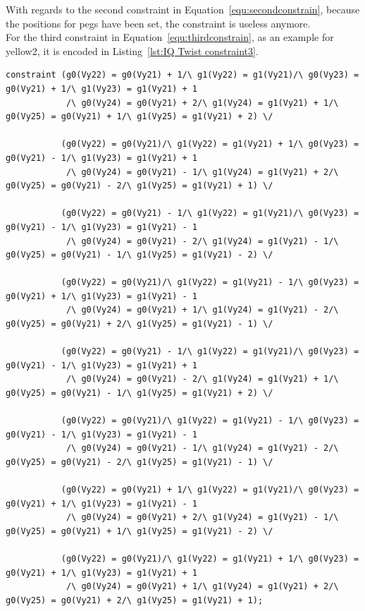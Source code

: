 \bigskip
\smallbreak
With regards to the second constraint in Equation~\ref{equ:secondconstrain}, because the positions for pegs have been set, the constraint is useless anymore.
\\For the third constraint in Equation~\ref{equ:thirdconstrain}, as an example for yellow2, it is encoded in Listing~\ref{lst:IQ Twist constraint3}.
\begin{lstlisting}[language=minizinc,numbers=none,caption={Encoding for constraint three},label={lst:IQ Twist constraint3}]
constraint (g0(Vy22) = g0(Vy21) + 1/\ g1(Vy22) = g1(Vy21)/\ g0(Vy23) = g0(Vy21) + 1/\ g1(Vy23) = g1(Vy21) + 1
            /\ g0(Vy24) = g0(Vy21) + 2/\ g1(Vy24) = g1(Vy21) + 1/\ g0(Vy25) = g0(Vy21) + 1/\ g1(Vy25) = g1(Vy21) + 2) \/
            
           (g0(Vy22) = g0(Vy21)/\ g1(Vy22) = g1(Vy21) + 1/\ g0(Vy23) = g0(Vy21) - 1/\ g1(Vy23) = g1(Vy21) + 1
            /\ g0(Vy24) = g0(Vy21) - 1/\ g1(Vy24) = g1(Vy21) + 2/\ g0(Vy25) = g0(Vy21) - 2/\ g1(Vy25) = g1(Vy21) + 1) \/
            
           (g0(Vy22) = g0(Vy21) - 1/\ g1(Vy22) = g1(Vy21)/\ g0(Vy23) = g0(Vy21) - 1/\ g1(Vy23) = g1(Vy21) - 1
            /\ g0(Vy24) = g0(Vy21) - 2/\ g1(Vy24) = g1(Vy21) - 1/\ g0(Vy25) = g0(Vy21) - 1/\ g1(Vy25) = g1(Vy21) - 2) \/
            
           (g0(Vy22) = g0(Vy21)/\ g1(Vy22) = g1(Vy21) - 1/\ g0(Vy23) = g0(Vy21) + 1/\ g1(Vy23) = g1(Vy21) - 1
            /\ g0(Vy24) = g0(Vy21) + 1/\ g1(Vy24) = g1(Vy21) - 2/\ g0(Vy25) = g0(Vy21) + 2/\ g1(Vy25) = g1(Vy21) - 1) \/
            
           (g0(Vy22) = g0(Vy21) - 1/\ g1(Vy22) = g1(Vy21)/\ g0(Vy23) = g0(Vy21) - 1/\ g1(Vy23) = g1(Vy21) + 1
            /\ g0(Vy24) = g0(Vy21) - 2/\ g1(Vy24) = g1(Vy21) + 1/\ g0(Vy25) = g0(Vy21) - 1/\ g1(Vy25) = g1(Vy21) + 2) \/
            
           (g0(Vy22) = g0(Vy21)/\ g1(Vy22) = g1(Vy21) - 1/\ g0(Vy23) = g0(Vy21) - 1/\ g1(Vy23) = g1(Vy21) - 1
            /\ g0(Vy24) = g0(Vy21) - 1/\ g1(Vy24) = g1(Vy21) - 2/\ g0(Vy25) = g0(Vy21) - 2/\ g1(Vy25) = g1(Vy21) - 1) \/
            
           (g0(Vy22) = g0(Vy21) + 1/\ g1(Vy22) = g1(Vy21)/\ g0(Vy23) = g0(Vy21) + 1/\ g1(Vy23) = g1(Vy21) - 1
            /\ g0(Vy24) = g0(Vy21) + 2/\ g1(Vy24) = g1(Vy21) - 1/\ g0(Vy25) = g0(Vy21) + 1/\ g1(Vy25) = g1(Vy21) - 2) \/
            
           (g0(Vy22) = g0(Vy21)/\ g1(Vy22) = g1(Vy21) + 1/\ g0(Vy23) = g0(Vy21) + 1/\ g1(Vy23) = g1(Vy21) + 1
            /\ g0(Vy24) = g0(Vy21) + 1/\ g1(Vy24) = g1(Vy21) + 2/\ g0(Vy25) = g0(Vy21) + 2/\ g1(Vy25) = g1(Vy21) + 1);
\end{lstlisting}
